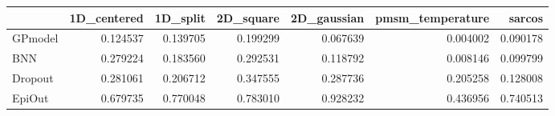 \begin{tabular}{lrrrrrr}
\toprule
{} &  1D\_centered &  1D\_split &  2D\_square &  2D\_gaussian &  pmsm\_temperature &    sarcos \\
\midrule
GPmodel &     0.124537 &  0.139705 &   0.199299 &     0.067639 &          0.004002 &  0.090178 \\
BNN     &     0.279224 &  0.183560 &   0.292531 &     0.118792 &          0.008146 &  0.099799 \\
Dropout &     0.281061 &  0.206712 &   0.347555 &     0.287736 &          0.205258 &  0.128008 \\
EpiOut  &     0.679735 &  0.770048 &   0.783010 &     0.928232 &          0.436956 &  0.740513 \\
\bottomrule
\end{tabular}
